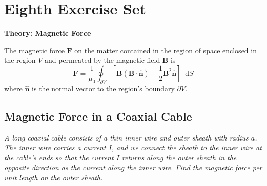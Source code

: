 \documentclass[11pt, a4paper]{article}
\newcommand{\diff}{\mathop{}\!\mathrm{d}} %
\renewcommand{\vec}[1]{\bm{#1}} %
\newcommand{\uvec}[1]{\hat{\vec{#1}}} %
\newcommand{\B}{\vec{B}}  %
\begin{document}
\begin{itemize}
\end{itemize}

\section{Eighth Exercise Set}

\textbf{Theory: Magnetic Force}\vspace{2mm}

The magnetic force $ \vec{F} $ on the matter contained in the region of space enclosed in the region $ V $ and permeated by the magnetic field $ \B $ is
\begin{equation*}
	\vec{F} = \frac{1}{\mu_{0}}\oint_{\partial V}\left [\B(\B \cdot \uvec{n}) - \frac{1}{2}\B^{2}\uvec{n}\right ] \diff S
\end{equation*}
where $ \uvec{n} $ is the normal vector to the region's boundary $ \partial V $.

\subsection{Magnetic Force in a Coaxial Cable}
\textit{A long coaxial cable consists of a thin inner wire and outer sheath with radius $ a $. The inner wire carries a current $ I $, and we connect the sheath to the inner wire at the cable's ends so that the current $ I $ returns along the outer sheath in the opposite direction as the current along the inner wire. Find the magnetic force per unit length on the outer sheath.}
\end{document}
